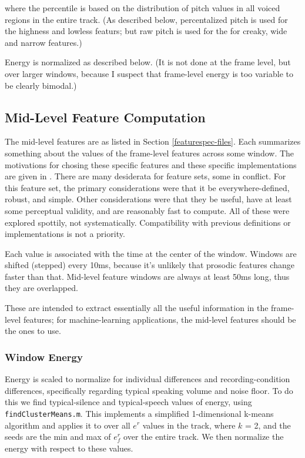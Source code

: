 \documentclass[11pt]{article}
\begin{document}
where the percentile is based on the distribution of pitch values in
all voiced regions in the entire track.  (As described below,
percentalized pitch is used for the highness and lowless featurs; but
raw pitch is used for the for creaky, wide and narrow features.)

Energy is normalized as described below. (It is not done at the frame
level, but over larger windows, because I suspect that frame-level
energy is too variable to be clearly bimodal.)


\subsection{Mid-Level Feature Computation}   \label{other-features}

The mid-level features are as listed in Section
\ref{featurespec-files}.  Each summarizes something about the values
of the frame-level features across some window.  The motivations for
chosing these specific features and these specific implementations are
given in \cite{mid-level-features}.  There are many desiderata for
feature sets, some in conflict.  For this feature set, the primary
considerations were that it be everywhere-defined, robust, and simple.
Other considerations were that they be useful, have at least some
perceptual validity, and are reasonably fast to compute.  All of these
were explored spottily, not systematically.  Compatibility with
previous definitions or implementations is not a priority.

Each value is associated with the time at the center of the window.
Windows are shifted (stepped) every 10ms, because it's unlikely that
prosodic features change faster than that.  Mid-level feature windows
are always at least 50ms long, thus they are overlapped.

These are intended to extract essentially all the useful information
in the frame-level features; for machine-learning applications, the
mid-level features should be the ones to use. 


\subsubsection{Window Energy}

Energy is scaled to normalize for individual differences and
recording-condition differences, specifically regarding typical
speaking volume and noise floor.  To do this we find typical-silence
and typical-speech values of energy, using {\tt findClusterMeans.m}.
This implements a simplified 1-dimensional k-means algorithm and
applies it to over all $e^r$ values in the track, where $k$ = 2, and
the seeds are the min and max of $e_f^r$ over the entire track.  We
then normalize the energy with respect to these values.
\end{document}
